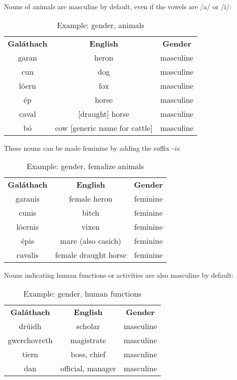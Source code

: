 Nouns of animals are masculine by default, even if the vowels are /a/ or /i/:
\begin{table}[H]
\centering
\begin{tabular}{ccc}
  \toprule
  \textbf{Gal\'{a}thach} & \textbf{English} & \textbf{Gender}\\
  \cmidrule(lr){1-1}\cmidrule(lr){2-2}\cmidrule(lr){3-3}
  garan & heron & masculine\\
  cun & dog & masculine\\
  l\'{o}ern & fox & masculine\\
  \'{e}p & horse & masculine\\
  caval & $[$draught$]$ horse & masculine\\
  b\'{o} & cow $[$generic name for cattle$]$ & masculine\\
  \bottomrule
\end{tabular}
\caption{Example: gender, animals}
\label{example_gender_animals}
\end{table}

These nouns can be made feminine by adding the suffix \textit{-is}:
\begin{table}[H]
\centering
\begin{tabular}{ccc}
  \toprule
  \textbf{Gal\'{a}thach} & \textbf{English} & \textbf{Gender}\\
  \cmidrule(lr){1-1}\cmidrule(lr){2-2}\cmidrule(lr){3-3}
  garanis & female heron & feminine\\
  cunis & bitch & feminine\\
  l\'{o}ernis & vixen & feminine\\
  \'{e}pis & mare (also casich) & feminine\\
  cavalis & female draught horse & feminine\\
  \bottomrule
\end{tabular}
\caption{Example: gender, femalize animals}
\label{example_gender_animals_femalize}
\end{table}

Nouns indicating human functions or activities are also masculine by default:
\begin{table}[H]
\centering
\begin{tabular}{ccc}
  \toprule
  \textbf{Gal\'{a}thach} & \textbf{English} & \textbf{Gender}\\
  \cmidrule(lr){1-1}\cmidrule(lr){2-2}\cmidrule(lr){3-3}
  dr\'{u}idh & scholar & masculine\\
  gwerchovreth & magistrate & masculine\\
  tiern & boss, chief & masculine\\
  dan & official, manager & masculine\\
  \bottomrule
\end{tabular}
\caption{Example: gender, human functions}
\label{example_gender_human_functions}
\end{table}

